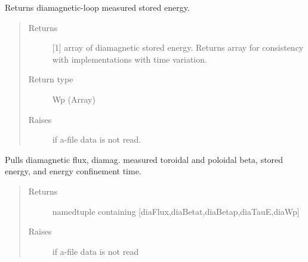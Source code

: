 \documentclass[letterpaper,10pt,english]{sphinxmanual}
\begin{document}
\begin{fulllineitems}
\begin{fulllineitems}
\label{\detokenize{eqtools:eqtools.eqdskreader.EqdskReader.getDiamagWp}}
Returns diamagnetic-loop measured stored energy.
\begin{quote}\begin{description}
\item[{Returns}] \leavevmode
{[}1{]} array of diamagnetic stored energy.
Returns array for consistency with
{\hyperref[\detokenize{eqtools:eqtools.core.Equilibrium}]{}}
implementations with time variation.

\item[{Return type}] \leavevmode
Wp (Array)

\item[{Raises}] \leavevmode
{} \textendash{} if a-file data is not read.

\end{description}\end{quote}

\end{fulllineitems}


\begin{fulllineitems}
\label{\detokenize{eqtools:eqtools.eqdskreader.EqdskReader.getDiamag}}
Pulls diamagnetic flux, diamag. measured toroidal and poloidal beta,
stored energy, and energy confinement time.
\begin{quote}\begin{description}
\item[{Returns}] \leavevmode
namedtuple containing {[}diaFlux,diaBetat,diaBetap,diaTauE,diaWp{]}

\item[{Raises}] \leavevmode
{} \textendash{} if a-file data is not read

\end{description}\end{quote}

\end{fulllineitems}



\end{fulllineitems}
\end{document}
